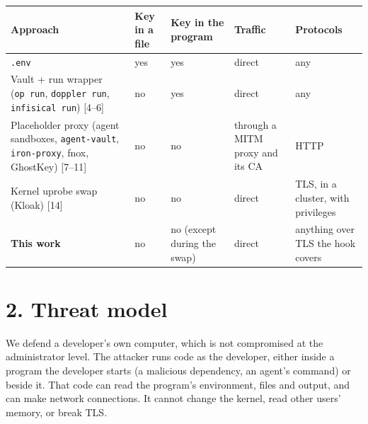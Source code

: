 \documentclass[
  11pt]{article}
\newcounter{none} %
\begin{document}
{\def\LTcaptype{none} %
\begin{longtable}[]{@{}
  >{\raggedright\arraybackslash}p{}
  >{\raggedright\arraybackslash}p{}
  >{\raggedright\arraybackslash}p{}
  >{\raggedright\arraybackslash}p{}
  >{\raggedright\arraybackslash}p{}@{}}
\toprule\noalign{}
\begin{minipage}[b]{\linewidth}\raggedright
Approach
\end{minipage} &
\begin{minipage}[b]{\linewidth}\raggedright
Key in a file
\end{minipage} &
\begin{minipage}[b]{\linewidth}\raggedright
Key in the program
\end{minipage} &
\begin{minipage}[b]{\linewidth}\raggedright
Traffic
\end{minipage} &
\begin{minipage}[b]{\linewidth}\raggedright
Protocols
\end{minipage} \\
\midrule\noalign{}
\endhead
\bottomrule\noalign{}
\endlastfoot
\texttt{.env} & yes & yes & direct &
any \\
Vault + run wrapper (\texttt{op\ run},
\texttt{doppler\ run},
\texttt{infisical\ run}) {[}4--6{]} & no
& yes & direct & any \\
Placeholder proxy (agent sandboxes,
\texttt{agent-vault},
\texttt{iron-proxy}, fnox, GhostKey)
{[}7--11{]} & no & no & through a MITM
proxy and its CA & HTTP \\
Kernel uprobe swap (Kloak) {[}14{]} & no
& no & direct & TLS, in a cluster, with
privileges \\
\textbf{This work} & no & no (except
during the swap) & direct & anything
over TLS the hook covers \\
\end{longtable}
}

\section*{2. Threat
model}\label{threat-model}

We defend a developer's own computer,
which is not compromised at the
administrator level. The attacker runs
code as the developer, either inside a
program the developer starts (a
malicious dependency, an agent's
command) or beside it. That code can
read the program's environment, files
and output, and can make network
connections. It cannot change the
kernel, read other users' memory, or
break TLS.
\end{document}
